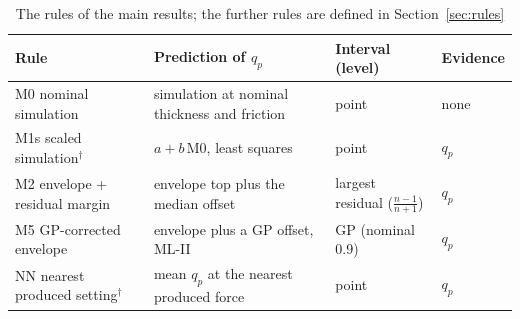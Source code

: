 \documentclass[pdflatex,sn-basic,lineno]{sn-jnl}
\newcommand{\tabsize}{\fontsize{8}{9.5}\selectfont}
\providecommand{\DIFaddbeginFL}{} %
\providecommand{\DIFdelbeginFL}{} %
\providecommand{\DIFdelendFL}{} %
\newcommand{\DIFscaledelfig}{0.5}
\newlength{\DIFdelgraphicswidth} %
\newlength{\DIFdelgraphicsheight} %
\newcommand{\DIFaddincludegraphics}[2][]{{\color{blue}\fbox{\DIFOincludegraphics[#1]{#2}}}} %
\newcommand{\DIFdelincludegraphics}[2][]{%
\sbox{\DIFdelgraphicsbox}{\DIFOincludegraphics[#1]{#2}}%
\settoboxwidth{\DIFdelgraphicswidth}{\DIFdelgraphicsbox} %
\settoboxtotalheight{\DIFdelgraphicsheight}{\DIFdelgraphicsbox} %
\scalebox{\DIFscaledelfig}{%
\parbox[b]{\DIFdelgraphicswidth}{\usebox{\DIFdelgraphicsbox}\\[-\baselineskip] \rule{\DIFdelgraphicswidth}{0em}}\llap{\resizebox{\DIFdelgraphicswidth}{\DIFdelgraphicsheight}{%
\setlength{\unitlength}{\DIFdelgraphicswidth}%
\begin{picture}(1,1)%
\thicklines\linethickness{2pt} %
{\color[rgb]{1,0,0}\put(0,0){\framebox(1,1){}}}%
{\color[rgb]{1,0,0}\put(0,0){\line( 1,1){1}}}%
{\color[rgb]{1,0,0}\put(0,1){\line(1,-1){1}}}%
\end{picture}%
}\hspace*{3pt}}} %
} %
\DeclareRobustCommand{\DIFaddbeginFL}{\DIFOaddbeginFL \let\includegraphics\DIFaddincludegraphics} %
\DeclareRobustCommand{\DIFdelbeginFL}{\DIFOdelbeginFL \let\includegraphics\DIFdelincludegraphics} %
\DeclareRobustCommand{\DIFdelendFL}{\DIFOaddendFL \let\includegraphics\DIFOincludegraphics} %
\begin{document}
\begin{table}[t]
\tabsize
\setlength{\tabcolsep}{3.5pt}
\caption{The rules of the main results; the further rules are defined in Section~\ref{sec:rules}}\label{tab:rules}
\DIFdelbeginFL %
\DIFdelendFL \DIFaddbeginFL \begin{tabular}{@{}L{3.6cm}L{4.6cm}L{2.3cm}L{1.4cm}@{}}
\toprule
Rule & Prediction of $q_p$ & Interval (level) & Evidence \\
\midrule
M0 nominal simulation & simulation at nominal thickness and friction & point & none \\
M1s scaled simulation$^\dagger$ & $a+b\,$M0, least squares & point & $q_p$ \\
M2 envelope + residual margin & envelope top plus the median offset & largest residual ($\frac{n-1}{n+1}$) & $q_p$ \\
M5 GP-corrected envelope & envelope plus a GP offset, ML-II & GP (nominal 0.9) & $q_p$ \\
NN nearest produced setting$^\dagger$ & mean $q_p$ at the nearest produced force & point & $q_p$ \\

\end{tabular}
\end{table}
\end{document}

